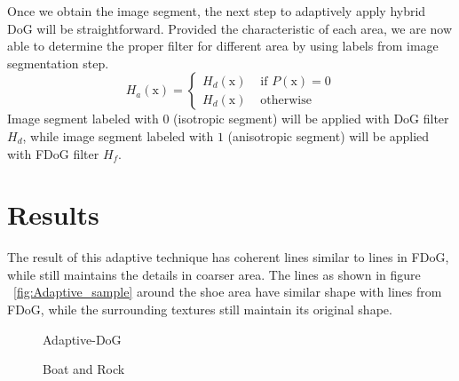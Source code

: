 Once we obtain the image segment, the next step to adaptively apply hybrid DoG will be straightforward. Provided the characteristic of each area, we are now able to determine the proper filter for different area by using labels from image segmentation step. 
\begin{equation}
	H_{a}(\mbox{x})=
		\left\{
			\begin{array}{ll}
				H_{d}(\mbox{x})&\mbox{ if }P(\mbox{x}) = 0
				\\
				H_{d}(\mbox{x})&\mbox{ otherwise }
			\end{array}
		\right.
\end{equation}
Image segment labeled with $0$ (isotropic segment) will be applied with DoG filter $H_{d}$, while image segment labeled with $1$ (anisotropic segment) will be applied with FDoG filter $H_{f}$. 

\chapter{Results}
The result of this adaptive technique has coherent lines similar to lines in FDoG, while still maintains the details in coarser area. The lines as shown in figure ~\ref{fig:Adaptive_sample} around the shoe area have similar shape with lines from FDoG, while the surrounding textures still maintain its original shape.

\begin{figure}[H]
	\centering
	\caption{Adaptive-DoG}\label{fig:Adaptive_DoG}
\end{figure}

\begin{figure}[H]
	\centering
	\caption{Boat and Rock}\label{fig:Compare1}
\end{figure}

